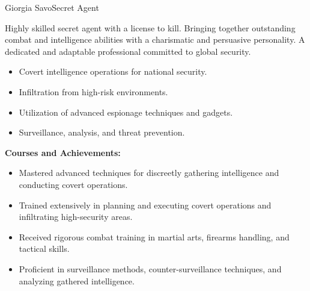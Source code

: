 \documentclass{article}
\begin{document}
\begin{cv}[avatar]{Giorgia Savo}{Secret Agent}



Highly skilled secret agent with a license to kill. 
Bringing together outstanding combat and intelligence abilities with a charismatic and persuasive personality. 
A dedicated and adaptable professional committed to global security.



\begin{cvevent}[1962][present]
    \begin{itemize}
        \item Covert intelligence operations for national security.
        \item Infiltration from high-risk environments.
        \item Utilization of advanced espionage techniques and gadgets.
        \item Surveillance, analysis, and threat prevention.
    \end{itemize}
\end{cvevent}



\begin{cvevent}[1958][09-2023]
    \textbf{Courses and Achievements:}
    \begin{itemize}
        \item Mastered advanced techniques for discreetly gathering intelligence and conducting covert operations.
        \item Trained extensively in planning and executing covert operations and infiltrating high-security areas.
        \item Received rigorous combat training in martial arts, firearms handling, and tactical skills.
        \item Proficient in surveillance methods, counter-surveillance techniques, and analyzing gathered intelligence.
    \end{itemize}
\end{cvevent}



\end{cv}
\end{document}
